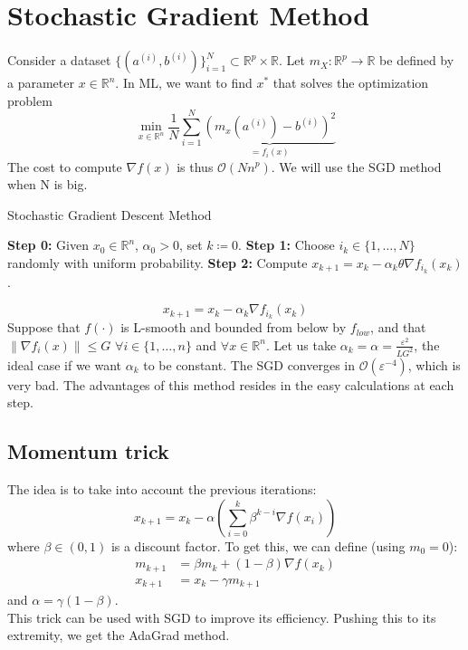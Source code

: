 \documentclass[12pt, openany]{report}
\newcommand{\R}{\mathbb{R}}
\theoremstyle{definition}
\begin{document}
\section{Stochastic Gradient Method}
Consider a dataset \(\{(a^{(i)},b^{(i)})\}_{i=1}^N\subset \R^p\times \R\). Let \(m_X:\R^p\rightarrow \R\) be defined by a parameter \(x\in \R^n\). In ML, we want to find \(x^*\) that solves the optimization problem
\begin{equation}
    \min_{x\in \R^n}\frac{1}{N}\sum_{i=1}^N \underbrace{\left(m_x\left(a^{(i)}\right)-b^{(i)}\right)^2}_{=f_i(x)}
\end{equation}
The cost to compute \(\nabla f(x)\) is thus \(\mathcal{O}(Nn^p)\). We will use the SGD method when N is big.
\begin{algorithm}
    \caption{Stochastic Gradient Descent Method}\label{algo:SGD}
    \begin{algorithmic}[1]
        \State \textbf{Step 0:} Given \(x_0\in \R^n\), \(\alpha_0>0\), set \(k\coloneqq 0\).
        \State \textbf{Step 1:} Choose \(i_k\in \{1,\dots,N\}\) randomly with uniform probability.
        \State \textbf{Step 2:} Compute \(x_{k+1}=x_k-\alpha_k \theta \nabla f_{i_k}(x_k)\).
    \end{algorithmic}
\end{algorithm}
\begin{equation}
    x_{k+1} = x_k-\alpha_k \nabla f_{i_k}(x_k)
\end{equation}
Suppose that $f(\cdot)$ is L-smooth and bounded from below by $f_{low}$, and that $\lVert \nabla f_i(x)\rVert \le G$ $\forall i\in \{1,\dots,n\}$ and $\forall x \in \R^n$. Let us take $\alpha_k = \alpha = \frac{\varepsilon^2}{LG^2}$, the ideal case if we want $\alpha_k$ to be constant. The SGD converges in $\mathcal{O}(\varepsilon^{-4})$, which is very bad. The advantages of this method resides in the easy calculations at each step. 
\subsection{Momentum trick}
The idea is to take into account the previous iterations:
\begin{equation}
    x_{k+1} = x_k - \alpha \left(\sum_{i=0}^k \beta^{k-i}\nabla f(x_i)\right)
\end{equation}
where $\beta \in (0,1)$ is a discount factor. To get this, we can define (using $m_0=0$):
\begin{align}
    m_{k+1}&=\beta m_k + (1-\beta)\nabla f(x_k)\nonumber\\
    x_{k+1}&= x_k - \gamma m_{k+1}
\end{align}
and $\alpha = \gamma(1-\beta)$.\\
This trick can be used with SGD to improve its efficiency. Pushing this to its extremity, we get the AdaGrad method.
\end{document}
